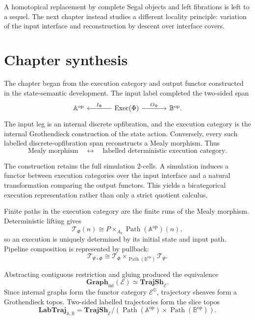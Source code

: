 A homotopical replacement by complete Segal objects and left fibrations is
left to a sequel. The next chapter instead studies a different locality
principle: variation of the input interface and reconstruction by descent
over interface covers.

\section{Chapter synthesis}
\label{sec:temporal-chapter-synthesis}

The chapter began from the execution category and output functor constructed
in the state-semantic development. The input label completed the two-sided
span
\[
\begin{tikzcd}[column sep=large]
    \mathbb A^{\mathrm{op}}
    &
    \operatorname{Exec}(\Phi)
        \arrow[l, "I_\Phi"']
        \arrow[r, "O_\Phi"]
    &
    \mathbb B^{\mathrm{op}}.
\end{tikzcd}
\]
The input leg is an internal discrete opfibration, and the execution category
is the internal Grothendieck construction of the state action. Conversely,
every such labelled discrete-opfibration span reconstructs a Mealy morphism.
Thus
\[
    \text{Mealy morphism}
    \quad\longleftrightarrow\quad
    \text{labelled deterministic execution category}.
\]

The construction retains the full simulation \(2\)-cells. A simulation
induces a functor between execution categories over the input interface and a
natural transformation comparing the output functors. This yields a
bicategorical execution representation rather than only a strict quotient
calculus.

Finite paths in the execution category are the finite runs of the Mealy
morphism. Deterministic lifting gives
\[
    \mathscr T_\Phi(n)
    \cong
    P\times_{A_0}
    \operatorname{Path}(\mathbb A^{\mathrm{op}})(n),
\]
so an execution is uniquely determined by its initial state and input path.
Pipeline composition is represented by pullback:
\[
    \mathscr T_{\Psi\circ\Phi}
    \cong
    \mathscr T_\Phi
    \times_{\operatorname{Path}(\mathbb B^{\mathrm{op}})}
    \mathscr T_\Psi.
\]

Abstracting contiguous restriction and gluing produced the equivalence
\[
    \mathbf{Graph}_{\mathrm{int}}(\mathcal E)
    \simeq
    \mathbf{TrajSh}_{\mathcal E}.
\]
Since internal graphs form the functor category
\(\mathcal E^{\mathbb G}\), trajectory sheaves form a Grothendieck topos.
Two-sided labelled trajectories form the slice topos
\[
    \mathbf{LabTraj}_{\mathbb A,\mathbb B}
    =
    \mathbf{TrajSh}_{\mathcal E}
    /
    \left(
        \operatorname{Path}(\mathbb A^{\mathrm{op}})
        \times
        \operatorname{Path}(\mathbb B^{\mathrm{op}})
    \right).
\]

